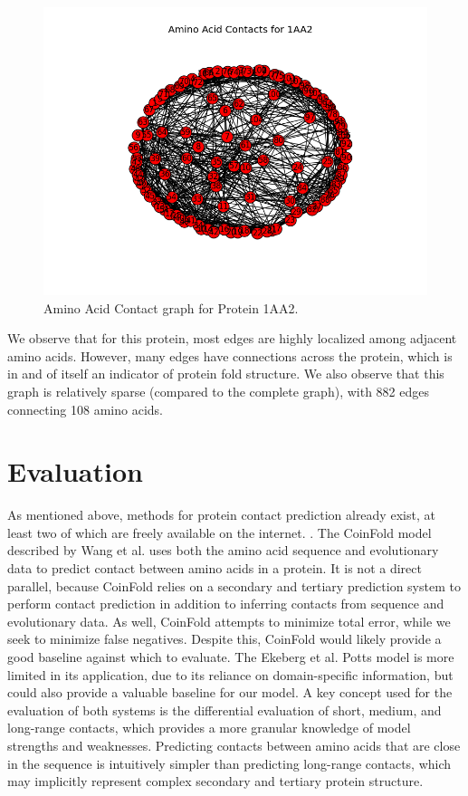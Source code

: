 \documentclass{article}
\begin{document}
\begin{figure}
\centering
\includegraphics[scale=0.5]{1aa2_plot.png}
\caption{Amino Acid Contact graph for Protein 1AA2.}
\end{figure}
 
We observe that for this protein, most edges are highly localized among adjacent amino acids. However, many edges have connections across the protein, which is in and of itself an indicator of protein fold structure. We also observe that this graph is relatively sparse (compared to the complete graph), with 882 edges connecting 108 amino acids. 


\section{Evaluation}
As mentioned above, methods for protein contact prediction already exist, at least two of which are freely available on the internet.\cite{ekeberg13} \cite{wang16}. The CoinFold model described by Wang et al. uses both the amino acid sequence and evolutionary data to predict contact between amino acids in a protein. It is not a direct parallel, because CoinFold relies on a secondary and tertiary prediction system to perform contact prediction in addition to inferring contacts from sequence and evolutionary data. As well, CoinFold attempts to minimize total error, while we seek to minimize false negatives. Despite this, CoinFold would likely provide a good baseline against which to evaluate. The Ekeberg et al. \cite{ekeberg13} Potts model is more limited in its application, due to its reliance on domain-specific information, but could also provide a valuable baseline for our model. A key concept used for the evaluation of both systems is the differential evaluation of short, medium, and long-range contacts, which provides a more granular knowledge of model strengths and weaknesses. Predicting contacts between amino acids that are close in the sequence is intuitively simpler than predicting long-range contacts, which may implicitly represent complex secondary and tertiary protein structure. 
\end{document}

